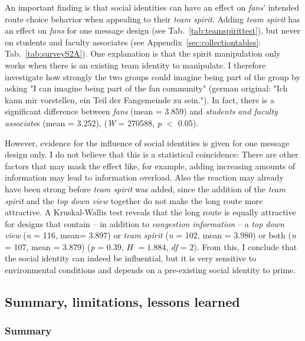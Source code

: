 An important finding is that social identities can have an effect on \textit{fans}' intended route choice behavior when appealing to their \textit{team spirit}.
Adding \textit{team spirit} has an effect on \textit{fans} for one message design (see Tab.~\ref{tab:teamspirittest}), but never on students and faculty associates (see  Appendix~\ref{sec:collectiontables}: Tab.~\ref{tab:surveyS2A}). 
One explanation is that the spirit manipulation only works when there is an existing team identity to manipulate. I therefore investigate how strongly the two groups could imagine being part of the group by asking "I can imagine being part of the fan community" (german original: "Ich kann mir vorstellen, ein Teil der Fangemeinde zu sein.").
In fact, there is a significant difference between \textit{fans} (mean = 3.859) and \textit{students and faculty associate}s (mean = 3.252), (\textit{W} = 270588, \textit{p} $<$ 0.05). 

However, evidence for the influence of social identities is given for one message design only. I do not believe that this is a statistical coincidence: There are other factors that may mask the effect like, for example, adding increasing amounts of information  may lead to information overload. Also the reaction may already have been strong before \textit{team spirit} was added, since the addition of the \textit{team spirit} and the \textit{top down view} together do not make the long route more attractive.
A Kruskal-Wallis test reveals that the long route is equally attractive for designs that contain -- in addition to \textit{congestion information} -- a \textit{top down view} (\textit{n} = 116, mean= 3.897) or \textit{team spirit} (\textit{n} = 102, mean = 3.980) or both (\textit{n} = 107, mean = 3.879)  (\textit{p} = $0.39$,  $H$ $= 1.884$, \textit{df} = $2$). From this, I conclude that the social identity can indeed be influential, but it is very sensitive to environmental conditions and depends on a pre-existing social identity to prime.


\FloatBarrier

\subsection{Summary, limitations, lessons learned}

\subsubsection{Summary}

